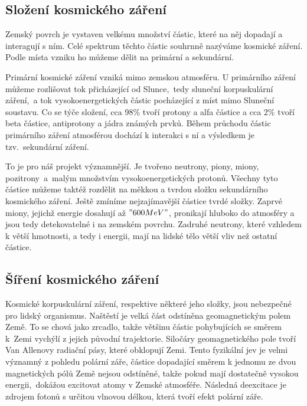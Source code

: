 \documentclass[12pt,a4paper]{article}
\begin{document}
\subsection*{Složení kosmického záření}
Zemský povrch je vystaven velkému množství částic,%
které na něj dopadají a interagují s ním. Celé
spektrum těchto částic souhrnně nazýváme kosmické záření. Podle místa vzniku ho
můžeme dělit na primární a sekundární.\par
Primární kosmické záření vzniká mimo zemskou atmosféru. U primárního záření
můžeme rozlišovat tok přicházející od Slunce,~tedy sluneční korpuskulární
záření,~a tok vysokoenergetických částic pocházející z míst mimo Sluneční
soustavu. Co se týče složení, cca 98\% tvoří protony a alfa částice a cca 2\%
tvoří beta částice, antiprotony a jádra známých prvků. Během průchodu částic
primárního záření atmosférou dochází k interakci s ní a výsledkem je
tzv.~sekundární záření.\par
To je pro náš projekt významnější. Je tvořeno neutrony, piony, miony,
pozitrony~a~malým množstvím vysokoenergetických protonů. Všechny tyto částice
můžeme taktéž rozdělit na měkkou a tvrdou složku sekundárního kosmického záření.
Ještě zmíníme nejzajímavější částice tvrdé složky. Zaprvé miony, jejichž energie
dosahují až $"600 MeV"$, pronikají hluboko do atmosféry a jsou tedy
detekovatelné i na zemském povrchu. Zadruhé neutrony, které vzhledem k větší
hmotnosti, a tedy i energii, mají na lidské tělo větší vliv než ostatní částice.\par
\subsection*{Šíření kosmického záření}
Kosmické korpuskulární záření, respektive některé jeho složky, jsou nebezpečné
pro lidský organismus. Naštěstí je velká část odstíněna geomagnetickým polem
Země. To se chová jako zrcadlo, takže většinu částic pohybujících se směrem
k~Zemi vychýlí z jejich původní trajektorie. Siločáry geomagnetického pole tvoří
Van Allenovy radiační pásy, které obklopují Zemi. Tento fyzikální jev je velmi
významný z pohledu polární záře, částice dopadající směrem k jednomu ze dvou
magnetických pólů Země nejsou odstíněné, takže pokud mají dostatečně vysokou
energii,~dokážou excitovat atomy v Zemské atmosféře. Následná deexcitace je
zdrojem fotonů s určitou vlnovou délkou, která tvoří efekt polární záře.\par
\end{document}
